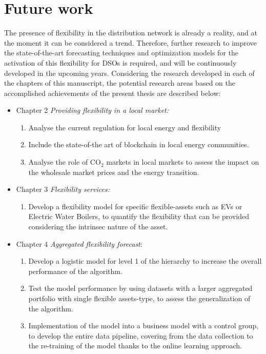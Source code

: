 \section{Future work}
The presence of flexibility in the distribution network is already a reality, and at the moment it can be considered a trend. Therefore, further research to improve the state-of-the-art forecasting techniques and optimization models for the activation of this flexibility for DSOs is required, and will be continuously developed in the upcoming years. 
Considering the research developed in each of the chapters of this manuscript, the potential research areas based on the accomplished achievements of the present thesis are described below: 

\begin{itemize}
\item Chapter 2 \textit{Providing flexibility in a local market:} 
	\begin{enumerate}
		\item Analyse the current regulation for local energy and flexibility 
		\item Include the state-of-the art of blockchain in local energy communities. 
		\item Analyse the role of CO$_2$ markets in local markets to assess the impact on the wholesale market prices and the energy transition. 
	\end{enumerate}
\item Chapter 3 \textit{Flexibility services:} 
	\begin{enumerate}
		\item Develop a flexibility model for specific flexible-assets such as EVs or Electric Water Boilers, to quantify the flexibility that can be provided considering the intrinsec nature of the asset. 
	\end{enumerate}
\item Chapter 4 \textit{Aggregated flexibility forecast}: 
	\begin{enumerate}
		\item Develop a logistic model for level 1 of the hierarchy to increase the overall performance of the algorithm. 
		\item Test the model performance by using datasets with a larger aggregated portfolio with single flexible assets-type, to assess the generalization of the algorithm.
		\item Implementation of the model into a business model with a control group, to develop the entire data pipeline, covering from the data collection to the re-training of the model thanks to the online learning approach.  

\end{enumerate}
\end{itemize}
